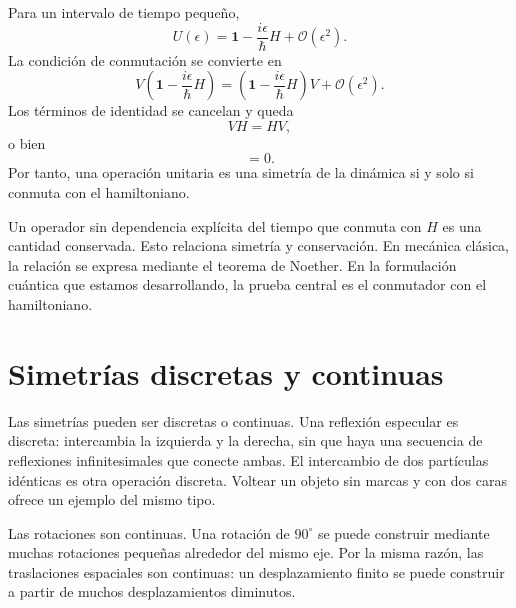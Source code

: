 Para un intervalo de tiempo pequeño,
\begin{equation}
U(\epsilon)
=
\mathbf 1-\frac{i\epsilon}{\hbar}H
+\mathcal O(\epsilon^2).
\end{equation}
La condición de conmutación se convierte en
\begin{equation}
V\left(
\mathbf 1-\frac{i\epsilon}{\hbar}H
\right)
=
\left(
\mathbf 1-\frac{i\epsilon}{\hbar}H
\right)V
+\mathcal O(\epsilon^2).
\end{equation}
Los términos de identidad se cancelan y queda
\begin{equation}
VH=HV,
\end{equation}
o bien
\begin{equation}
[V,H]=0.
\end{equation}
Por tanto, una operación unitaria es una simetría de la dinámica si y solo si conmuta con el hamiltoniano.

\begin{classroomqa}
\end{classroomqa}

Un operador sin dependencia explícita del tiempo que conmuta con \(H\) es una cantidad conservada. Esto relaciona simetría y conservación. En mecánica clásica, la relación se expresa mediante el teorema de Noether. En la formulación cuántica que estamos desarrollando, la prueba central es el conmutador con el hamiltoniano.

\section{Simetrías discretas y continuas}

Las simetrías pueden ser discretas o continuas. Una reflexión especular es discreta: intercambia la izquierda y la derecha, sin que haya una secuencia de reflexiones infinitesimales que conecte ambas. El intercambio de dos partículas idénticas es otra operación discreta. Voltear un objeto sin marcas y con dos caras ofrece un ejemplo del mismo tipo.

Las rotaciones son continuas. Una rotación de \(90^\circ\) se puede construir mediante muchas rotaciones pequeñas alrededor del mismo eje. Por la misma razón, las traslaciones espaciales son continuas: un desplazamiento finito se puede construir a partir de muchos desplazamientos diminutos.

